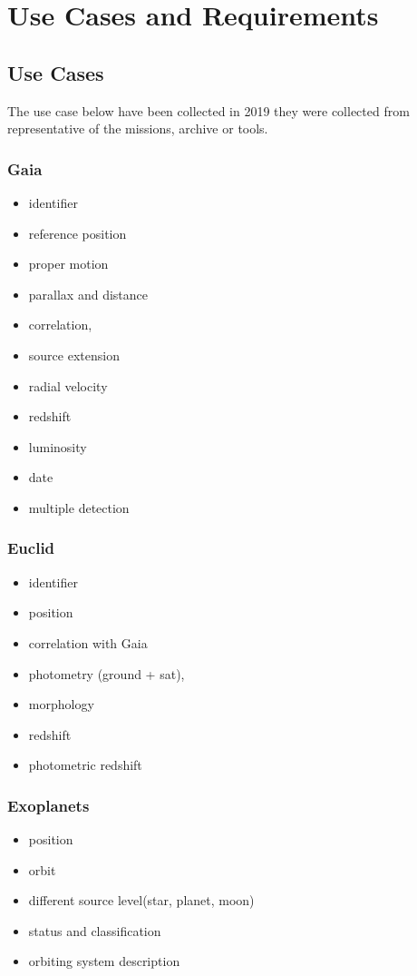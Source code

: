 \documentclass[11pt,a4paper]{ivoa}
\begin{document}
\section{Use Cases and  Requirements}

\subsection{Use Cases}
The use case below have been collected in 2019 they were collected from representative of the missions, archive or tools.

\subsubsection{Gaia}
\begin{itemize}
    \item identifier
    \item reference position
    \item proper motion
    \item parallax and distance
    \item correlation,
    \item source extension
    \item radial velocity
    \item redshift
    \item luminosity
    \item date
    \item multiple detection
\end{itemize}


\subsubsection{Euclid}
\begin{itemize}    
    \item identifier
    \item position
    \item correlation with Gaia
    \item photometry (ground + sat),
    \item morphology
    \item redshift
    \item photometric redshift
\end{itemize}

\subsubsection{Exoplanets}
\begin{itemize}
    \item position
    \item orbit
    \item different source level(star, planet, moon)
    \item status and classification
    \item orbiting system description
\end{itemize}
\end{document}
